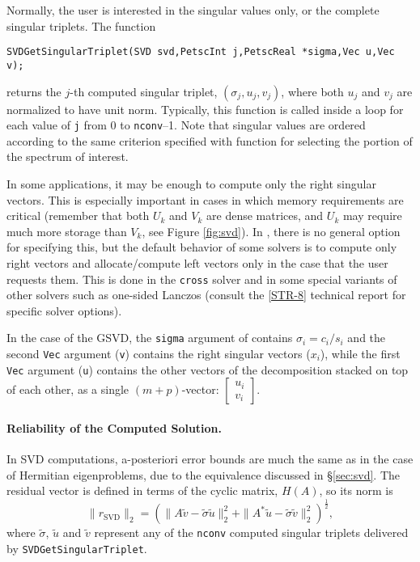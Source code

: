 Normally, the user is interested in the singular values only, or the complete singular triplets. The function
	\begin{Verbatim}[fontsize=\small]
	SVDGetSingularTriplet(SVD svd,PetscInt j,PetscReal *sigma,Vec u,Vec v);
	\end{Verbatim}
returns the $j$-th computed singular triplet, $(\sigma_j,u_j,v_j)$, where both $u_j$ and $v_j$ are normalized to have unit norm. Typically, this function is called inside a loop for each value of \texttt{j} from 0 to \texttt{nconv}--1. Note that singular values are ordered according to the same criterion specified with function  for selecting the portion of the spectrum of interest.

In some applications, it may be enough to compute only the right singular vectors. This is especially important in cases in which memory requirements are critical (remember that both $U_k$ and $V_k$ are dense matrices, and $U_k$ may require much more storage than $V_k$, see Figure \ref{fig:svd}). In \slepc, there is no general option for specifying this, but the default behavior of some solvers is to compute only right vectors and allocate/compute left vectors only in the case that the user requests them. This is done in the \texttt{cross} solver and in some special variants of other solvers such as one-sided Lanczos (consult the \hyperlink{str}{[STR-8]} technical report for specific solver options).

In the case of the GSVD, the \texttt{sigma} argument of  contains $\sigma_i=c_i/s_i$ and the second \texttt{Vec} argument (\texttt{v}) contains the right singular vectors ($x_i$), while the first \texttt{Vec} argument (\texttt{u}) contains the other vectors of the decomposition stacked on top of each other, as a single $(m+p)$-vector: $\begin{bmatrix}u_i\\v_i\end{bmatrix}$.

\paragraph{Reliability of the Computed Solution.}

In SVD computations, a-posteriori error bounds are much the same as in the case of Hermitian eigenproblems, due to the equivalence discussed in \S\ref{sec:svd}. The residual vector is defined in terms of the cyclic matrix, $H(A)$, so its norm is
\begin{equation}
\|r_\mathrm{SVD}\|_2=\left(\|A\tilde{v}-\tilde{\sigma}\tilde{u}\|_2^2+\|A^*\tilde{u}-\tilde{\sigma}\tilde{v}\|_2^2\right)^{\frac{1}{2}},
\end{equation}
where $\tilde{\sigma}$, $\tilde{u}$ and $\tilde{v}$ represent any of the \texttt{nconv} computed singular triplets delivered by \texttt{SVDGetSingularTriplet}.

